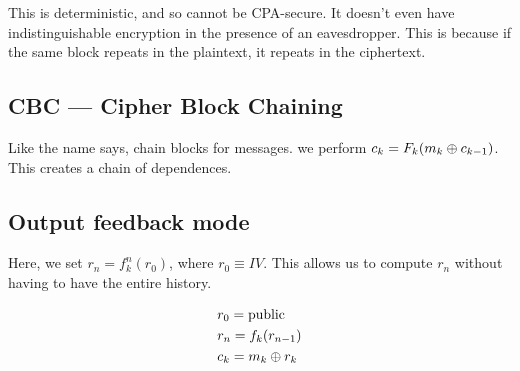 This is deterministic, and so cannot be CPA-secure.  It doesn't even have
indistinguishable encryption in the presence of an eavesdropper. This is
because if the same block repeats in the plaintext, it repeats in the
ciphertext.


\subsection{CBC --- Cipher Block Chaining}

Like the name says, chain blocks for messages. we perform $c_k = F_k(m_k \oplus c_{k - 1})$. This creates a chain of dependences.

\subsection{Output feedback mode} 
Here, we set $r_n = f_k^n(r_0)$, where $r_0 \equiv IV$. This allows us to
compute $r_n$ without having to have the entire history.

\begin{align*}
    &r_0 = \text{public} \\
    &r_n = f_k(r_{n - 1}) \\
    &c_k = m_k \oplus r_k
\end{align*}



